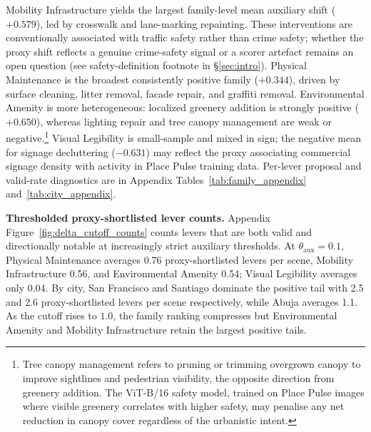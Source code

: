 Mobility Infrastructure yields the largest family-level mean auxiliary
shift ($+0.579$), led by crosswalk and lane-marking repainting.
These interventions are conventionally associated with traffic safety
rather than crime safety; whether the proxy shift reflects a genuine
crime-safety signal or a scorer artefact remains an open question
(see safety-definition footnote in \S\ref{sec:intro}).
Physical Maintenance is the broadest consistently positive family
($+0.344$), driven by surface cleaning, litter removal, facade repair,
and graffiti removal. Environmental Amenity is more heterogeneous:
localized greenery addition is strongly positive ($+0.650$), whereas
lighting repair and tree canopy management are weak or
negative.\footnote{Tree canopy management refers to pruning or trimming
overgrown canopy to improve sightlines and pedestrian visibility, 
the opposite direction from greenery addition. The ViT-B/16 safety model, trained
on Place Pulse images where visible greenery correlates with higher
safety, may penalise any net reduction in canopy cover regardless of
the urbanistic intent.}
Visual Legibility is small-sample and mixed in sign; the negative mean
for signage decluttering ($-0.631$) may reflect the proxy associating
commercial signage density with activity in Place Pulse training data.
Per-lever proposal and valid-rate diagnostics are in
Appendix Tables~\ref{tab:family_appendix} and~\ref{tab:city_appendix}.

\noindent\textbf{Thresholded proxy-shortlisted lever counts.}
Appendix Figure~\ref{fig:delta_cutoff_counts} counts levers that are both valid
and directionally notable at increasingly strict auxiliary thresholds.
At $\theta_{\mathrm{aux}}{=}0.1$, Physical Maintenance averages 0.76
proxy-shortlisted levers per scene, Mobility Infrastructure 0.56, and
Environmental Amenity 0.54; Visual Legibility averages only 0.04.
By city, San Francisco and Santiago dominate the positive tail with
2.5 and 2.6 proxy-shortlisted levers per scene respectively, while
Abuja averages 1.1. As the cutoff rises to $1.0$, the family ranking
compresses but Environmental Amenity and Mobility Infrastructure retain
the largest positive tails.

